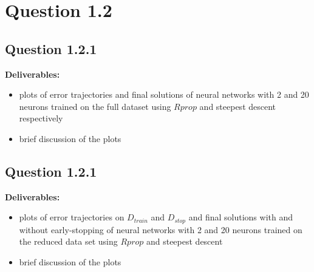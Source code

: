 \section*{Question 1.2}

\subsection*{Question 1.2.1}

\textbf{Deliverables:}

\begin{itemize}
	\item plots of error trajectories and final solutions of neural networks with 2 and 20 neurons trained on the full dataset using $Rprop$ and steepest descent respectively

	\item brief discussion of the plots
\end{itemize}

\subsection*{Question 1.2.1}
\textbf{Deliverables:}
\begin{itemize}

	\item plots of error trajectories on $D_{train}$ and $D_{stop}$ and final solutions with and without early-stopping of neural networks with 2 and 20 neurons trained on the reduced data set using $Rprop$ and steepest descent

	\item brief discussion of the plots
\end{itemize}
